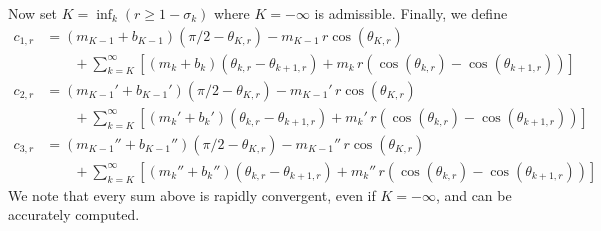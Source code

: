 \documentclass[10pt,english,letter, reqno]{amsart}
\theoremstyle{plain}
\theoremstyle{definition}
\begin{document}
Now set $K=\inf_{k}(r\geq 1-\sigma_k)$ where $K=-\infty$ is admissible. Finally, we define
\begin{align*} c_{1,r} &= (m_{K-1}+b_{K-1})(\pi/2-\theta_{K,r}) - m_{K-1}\,r\cos(\theta_{K,r})\\
&\qquad+ \sum_{k=K}^{\infty} \left[ (m_k+b_k)(\theta_{k,r}-\theta_{k+1,r}) + m_k\,r\left(\cos(\theta_{k,r})-\cos(\theta_{k+1,r})\right)\right] \\
c_{2,r} & = (m_{K-1}'+b_{K-1}')(\pi/2-\theta_{K,r}) - m_{K-1}'\,r\cos(\theta_{K,r})
\\&\qquad+ \sum_{k=K}^{\infty} \left[ (m_k'+b_k')(\theta_{k,r}-\theta_{k+1,r}) + m_k'\,r\left(\cos(\theta_{k,r})-\cos(\theta_{k+1,r})\right)\right] \\ 
c_{3,r} & = (m_{K-1}''+b_{K-1}'')(\pi/2-\theta_{K,r}) - m_{K-1}''\,r\cos(\theta_{K,r})
\\&\qquad+ \sum_{k=K}^{\infty} \left[ (m_k''+b_k'')(\theta_{k,r}-\theta_{k+1,r}) + m_k''\,r\left(\cos(\theta_{k,r})-\cos(\theta_{k+1,r})\right)\right]
\end{align*}
We note that every sum above is rapidly convergent, even if $K=-\infty$, and can be accurately computed.
\end{document}
